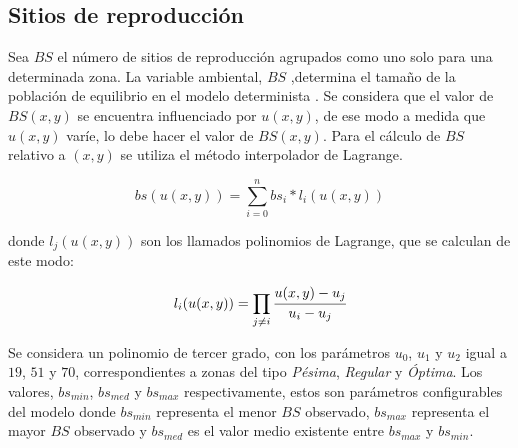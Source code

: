 \subsection{Sitios de reproducción}
\label{subsec:cap4-sitios de reproduccion}
Sea $BS$ el número de sitios de reproducción agrupados como uno solo para una determinada zona. La
variable ambiental, $BS$ ,determina el tamaño de la población de equilibrio en el modelo
determinista \cite{otero2006stochastic, otero2008stochastic}. Se considera que el valor de
$BS(x,y)$ se encuentra influenciado por $u(x,y)$, de ese modo a medida que $u(x,y)$ varíe, lo debe
hacer el valor de $BS(x,y)$. Para el cálculo de $BS$ relativo a $(x,y)$ se utiliza el método
interpolador de Lagrange.

\begin{equation}
\label{eq:sitios-reproduccion-x-y}
    bs(u(x,y)) = \sum_{i=0}^{n} bs_{i} * l_{i}(u(x,y))
\end{equation}

donde $l_j(u(x,y))$ son los llamados polinomios de Lagrange, que se calculan de este modo:

\begin{equation}
\label{eq:sitios-reproduccion-x-y}
    l_{i}(u(x,y)) = \prod_{j \neq i} \cfrac{u(x,y) - u_{j}}{u_{i} - u_{j}}
\end{equation}

Se considera un polinomio de tercer grado, con los parámetros $u_0$, $u_1$ y $u_2$ igual a $19$,
$51$ y $70$, correspondientes a zonas del tipo \textit{Pésima}, \textit{Regular} y \textit{Óptima}.
Los valores, $bs_{min}$, $bs_{med}$ y $bs_{max}$ respectivamente, estos son parámetros
configurables del modelo donde $bs_{min}$ representa el menor $BS$ observado, $bs_{max}$
representa el mayor $BS$ observado y $bs_{med}$ es el valor medio existente entre $bs_{max}$ y
$bs_{min}$.

